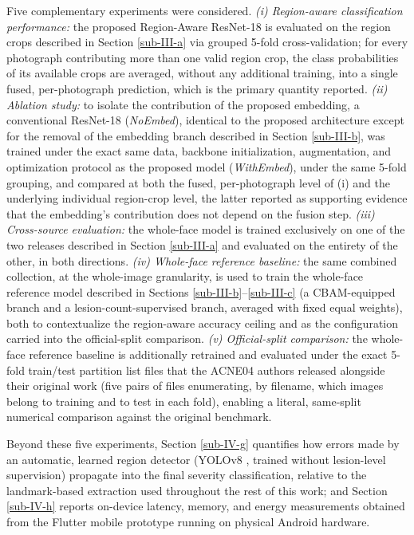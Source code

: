 \documentclass[conference]{IEEEtran}
\begin{document}
Five complementary experiments were considered. \textit{(i) Region-aware classification performance:} the proposed Region-Aware ResNet-18 is evaluated on the region crops described in Section \ref{sub-III-a} via grouped 5-fold cross-validation; for every photograph contributing more than one valid region crop, the class probabilities of its available crops are averaged, without any additional training, into a single fused, per-photograph prediction, which is the primary quantity reported. \textit{(ii) Ablation study:} to isolate the contribution of the proposed embedding, a conventional ResNet-18 (\textit{NoEmbed}), identical to the proposed architecture except for the removal of the embedding branch described in Section \ref{sub-III-b}, was trained under the exact same data, backbone initialization, augmentation, and optimization protocol as the proposed model (\textit{WithEmbed}), under the same 5-fold grouping, and compared at both the fused, per-photograph level of (i) and the underlying individual region-crop level, the latter reported as supporting evidence that the embedding's contribution does not depend on the fusion step. \textit{(iii) Cross-source evaluation:} the whole-face model is trained exclusively on one of the two releases described in Section \ref{sub-III-a} and evaluated on the entirety of the other, in both directions. \textit{(iv) Whole-face reference baseline:} the same combined collection, at the whole-image granularity, is used to train the whole-face reference model described in Sections \ref{sub-III-b}--\ref{sub-III-c} (a CBAM-equipped branch and a lesion-count-supervised branch, averaged with fixed equal weights), both to contextualize the region-aware accuracy ceiling and as the configuration carried into the official-split comparison. \textit{(v) Official-split comparison:} the whole-face reference baseline is additionally retrained and evaluated under the exact 5-fold train/test partition list files that the ACNE04 authors released alongside their original work \cite{b30} (five pairs of files enumerating, by filename, which images belong to training and to test in each fold), enabling a literal, same-split numerical comparison against the original benchmark.

Beyond these five experiments, Section \ref{sub-IV-g} quantifies how errors made by an automatic, learned region detector (YOLOv8 \cite{b33}, trained without lesion-level supervision) propagate into the final severity classification, relative to the landmark-based extraction used throughout the rest of this work; and Section \ref{sub-IV-h} reports on-device latency, memory, and energy measurements obtained from the Flutter mobile prototype running on physical Android hardware.
\end{document}
